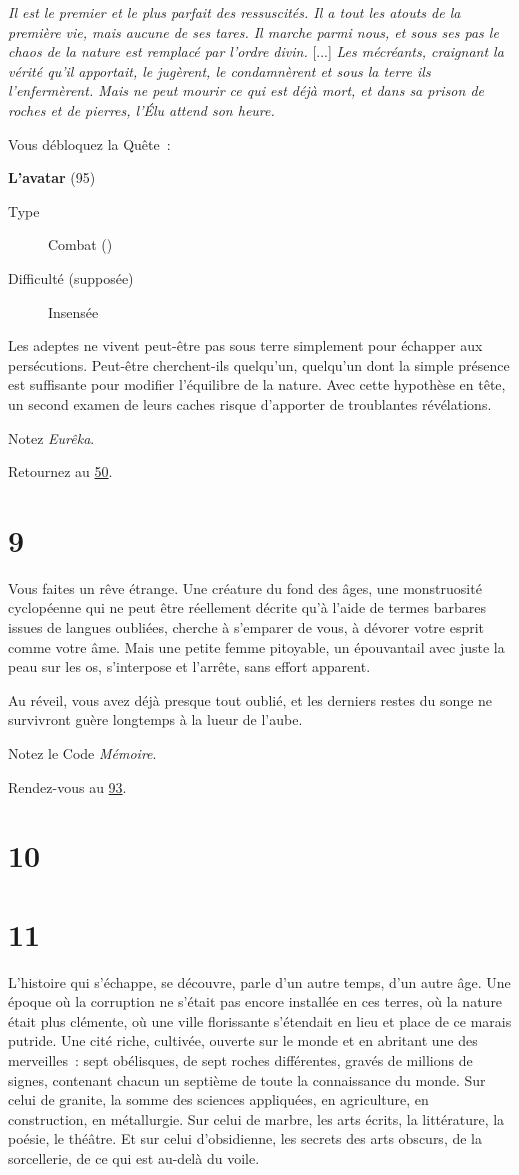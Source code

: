 \documentclass{report}
\newcommand{\gsection}[1]{
    \section{#1}
    \label{section-#1}
}
\newcommand{\glink}[1]{\hyperref[section-#1]{#1}}
\newcommand{\quest}[5]{
    \begin{mdframed}[innertopmargin=0.5cm,innerbottommargin=0.5cm]
        \begin{center}
            \textbf{#1} (#2)
        \end{center}
        \begin{description}
            \item[Type] #3
            \item[Difficulté (supposée)] #4
        \end{description}
        #5
    \end{mdframed}
}
\begin{document}
\textit{Il est le premier et le plus parfait des ressuscités. Il a tout les atouts de la première vie, mais aucune de ses tares. Il marche parmi nous, et sous ses pas le chaos de la nature est remplacé par l'ordre divin.} [...] \textit{Les mécréants, craignant la vérité qu'il apportait, le jugèrent, le condamnèrent et sous la terre ils l'enfermèrent. Mais ne peut mourir ce qui est déjà mort, et dans sa prison de roches et de pierres, l'Élu attend son heure.}

Vous débloquez la Quête :
\clearpage

\quest{L'avatar}{95}{Combat (\ankh)}{Insensée}{
Les adeptes ne vivent peut-être pas sous terre simplement pour échapper aux persécutions. Peut-être cherchent-ils quelqu'un, quelqu'un dont la simple présence est suffisante pour modifier l'équilibre de la nature. Avec cette hypothèse en tête, un second examen de leurs caches risque d'apporter de troublantes révélations.
}

Notez \emph{Eurêka}.

Retournez au \glink{50}.

\gsection{9}

Vous faites un rêve étrange. Une créature du fond des âges, une monstruosité cyclopéenne qui ne peut être réellement décrite qu'à l'aide de termes barbares issues de langues oubliées, cherche à s'emparer de vous, à dévorer votre esprit comme votre âme. Mais une petite femme pitoyable, un épouvantail avec juste la peau sur les os, s'interpose et l'arrête, sans effort apparent.

Au réveil, vous avez déjà presque tout oublié, et les derniers restes du songe ne survivront guère longtemps à la lueur de l'aube.

Notez le Code \emph{Mémoire}.

Rendez-vous au \glink{93}.

\gsection{10}

\gsection{11}

L'histoire qui s'échappe, se découvre, parle d'un autre temps, d'un autre âge. Une époque où la corruption ne s'était pas encore installée en ces terres, où la nature était plus clémente, où une ville florissante s'étendait en lieu et place de ce marais putride. Une cité riche, cultivée, ouverte sur le monde et en abritant une des merveilles : sept obélisques, de sept roches différentes, gravés de millions de signes, contenant chacun un septième de toute la connaissance du monde. Sur celui de granite, la somme des sciences appliquées, en agriculture, en construction, en métallurgie. Sur celui de marbre, les arts écrits, la littérature, la poésie, le théâtre. Et sur celui d'obsidienne, les secrets des arts obscurs, de la sorcellerie, de ce qui est au-delà du voile.
\end{document}
